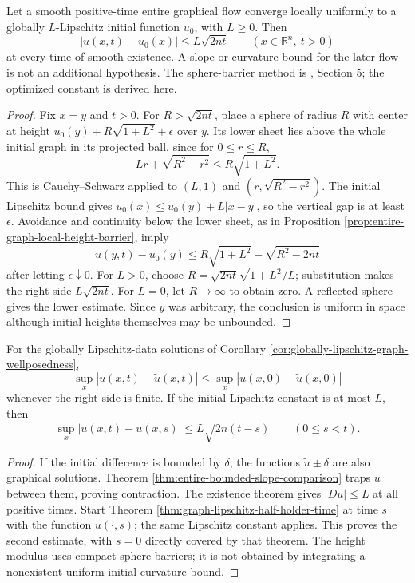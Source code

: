 \begin{theorem}\label{thm:graph-lipschitz-half-holder-time}
Let a smooth positive-time entire graphical flow converge locally uniformly to a globally $L$-Lipschitz initial function $u_0$, with $L\geq0$. Then
\[
 |u(x,t)-u_0(x)|\leq L\sqrt{2nt}
 \qquad(x\in\mathbb R^n,\ t>0)
\]
at every time of smooth existence. A slope or curvature bound for the later flow is not an additional hypothesis. The sphere-barrier method is \cite{EH91}, Section 5; the optimized constant is derived here.
\end{theorem}
\begin{proof}
Fix $x=y$ and $t>0$. For $R>\sqrt{2nt}$, place a sphere of radius $R$ with center at height $u_0(y)+R\sqrt{1+L^2}+\epsilon$ over $y$. Its lower sheet lies above the whole initial graph in its projected ball, since for $0\leq r\leq R$,
\[
 Lr+\sqrt{R^2-r^2}\leq R\sqrt{1+L^2}.
\]
This is Cauchy--Schwarz applied to $(L,1)$ and $(r,\sqrt{R^2-r^2})$. The initial Lipschitz bound gives $u_0(x)\leq u_0(y)+L|x-y|$, so the vertical gap is at least $\epsilon$. Avoidance and continuity below the lower sheet, as in Proposition \ref{prop:entire-graph-local-height-barrier}, imply
\[
 u(y,t)-u_0(y)\leq R\sqrt{1+L^2}-\sqrt{R^2-2nt}
\]
after letting $\epsilon\downarrow0$. For $L>0$, choose $R=\sqrt{2nt}\sqrt{1+L^2}/L$; substitution makes the right side $L\sqrt{2nt}$. For $L=0$, let $R\to\infty$ to obtain zero. A reflected sphere gives the lower estimate. Since $y$ was arbitrary, the conclusion is uniform in space although initial heights themselves may be unbounded.
\end{proof}

\begin{proposition}\label{prop:graphical-uniform-contraction}
For the globally Lipschitz-data solutions of Corollary \ref{cor:globally-lipschitz-graph-wellposedness},
\[
 \sup_x|u(x,t)-\widetilde u(x,t)|
 \leq\sup_x|u(x,0)-\widetilde u(x,0)|
\]
whenever the right side is finite. If the initial Lipschitz constant is at most $L$, then
\[
 \sup_x|u(x,t)-u(x,s)|\leq L\sqrt{2n(t-s)}\qquad(0\leq s<t).
\]
\end{proposition}
\begin{proof}
If the initial difference is bounded by $\delta$, the functions $\widetilde u\pm\delta$ are also graphical solutions. Theorem \ref{thm:entire-bounded-slope-comparison} traps $u$ between them, proving contraction. The existence theorem gives $|Du|\leq L$ at all positive times. Start Theorem \ref{thm:graph-lipschitz-half-holder-time} at time $s$ with the function $u(\cdot,s)$; the same Lipschitz constant applies. This proves the second estimate, with $s=0$ directly covered by that theorem. The height modulus uses compact sphere barriers; it is not obtained by integrating a nonexistent uniform initial curvature bound.
\end{proof}

